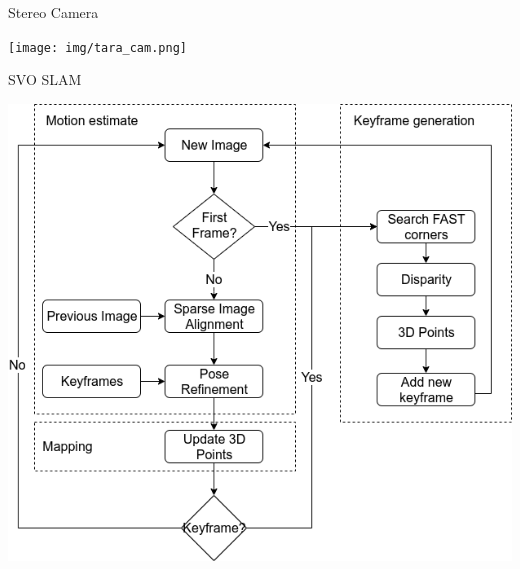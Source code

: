 \documentclass[aspectratio=169,12pt]{beamer}
\begin{document}
\begin{frame}{Stereo Camera}
  \begin{center}
    \texttt{[image: img/tara\_cam.png]}
  \end{center}
\end{frame}


\begin{frame}{SVO SLAM}
  \begin{center}
    \includegraphics[height=0.95\textheight]{../img/our_svo_slam.png}
  \end{center}
\end{frame}
\end{document}
